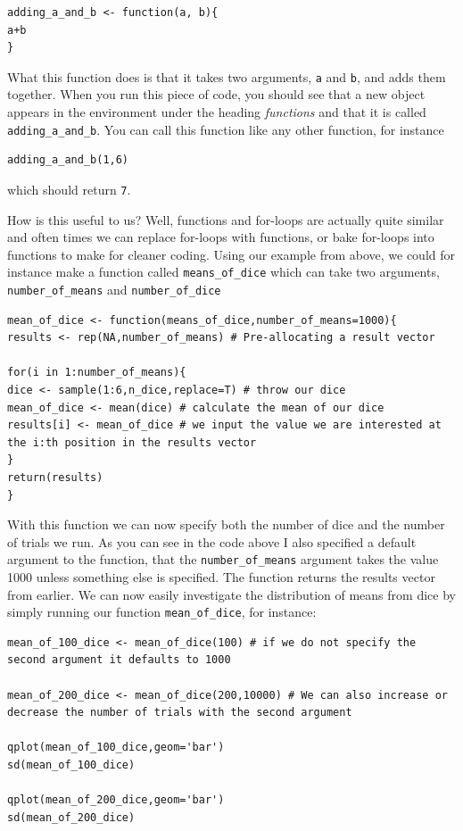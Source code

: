 \documentclass[
]{book}
\begin{document}
\begin{verbatim}
adding_a_and_b <- function(a, b){
a+b
}
\end{verbatim}

What this function does is that it takes two arguments, \texttt{a} and \texttt{b}, and adds them together. When you run this piece of code, you should see that a new object appears in the environment under the heading \emph{functions} and that it is called \texttt{adding\_a\_and\_b}. You can call this function like any other function, for instance

\begin{verbatim}
adding_a_and_b(1,6)
\end{verbatim}

which should return \texttt{7}.

How is this useful to us? Well, functions and for-loops are actually quite similar and often times we can replace for-loops with functions, or bake for-loops into functions to make for cleaner coding. Using our example from above, we could for instance make a function called \texttt{means\_of\_dice} which can take two arguments, \texttt{number\_of\_means} and \texttt{number\_of\_dice}

\begin{verbatim}
mean_of_dice <- function(means_of_dice,number_of_means=1000){
results <- rep(NA,number_of_means) # Pre-allocating a result vector

for(i in 1:number_of_means){
dice <- sample(1:6,n_dice,replace=T) # throw our dice
mean_of_dice <- mean(dice) # calculate the mean of our dice
results[i] <- mean_of_dice # we input the value we are interested at the i:th position in the results vector
}
return(results)
}
\end{verbatim}

With this function we can now specify both the number of dice and the number of trials we run. As you can see in the code above I also specified a default argument to the function, that the \texttt{number\_of\_means} argument takes the value 1000 unless something else is specified. The function returns the results vector from earlier. We can now easily investigate the distribution of means from dice by simply running our function \texttt{mean\_of\_dice}, for instance:

\begin{verbatim}
mean_of_100_dice <- mean_of_dice(100) # if we do not specify the second argument it defaults to 1000

mean_of_200_dice <- mean_of_dice(200,10000) # We can also increase or decrease the number of trials with the second argument

qplot(mean_of_100_dice,geom='bar')
sd(mean_of_100_dice)

qplot(mean_of_200_dice,geom='bar')
sd(mean_of_200_dice)
\end{verbatim}
\end{document}
